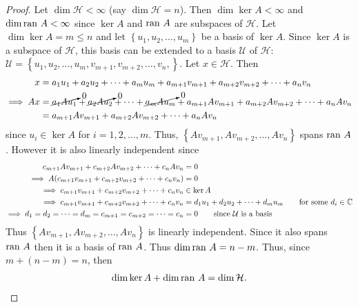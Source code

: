 \documentclass{article} %
\theoremstyle{plain}
\def\Cx{\mathbb{C}}
\newcommand{\ran}{\text{\rm ran }}
\numberwithin{equation}{section} %
\numberwithin{figure}{section} %
\numberwithin{table}{section} %
\begin{document}
\begin{proof}
    Let $\dim \mathcal{H} < \infty$ (say $\dim \mathcal{H} = n$).  Then $\dim \ker A < \infty$ and $\dim \ran A < \infty$ since $\ker A$ and $\ran A$ are subspaces of $\mathcal{H}$.  Let $\dim \ker A = m \leq n$ and let $\left\{u_1, u_2, \dots, u_m\right\}$ be a basis of $\ker A$.  Since $\ker A$ is a subspace of $\mathcal{H}$, this basis can be extended to a basis $\mathcal{U}$ of $\mathcal{H}$: $\mathcal{U} = \left\{u_1, u_2, \dots, u_m, v_{m+1}, v_{m+2}, \dots, v_{n}, \right\}$.  Let $x \in \mathcal{H}$.  Then
    \begin{align*}
        x &= a_1u_1 + a_2u_2 + \dots + a_mu_m + a_{m+1}v_{m+1} + a_{m+2}v_{m+2} + \dots + a_nv_n \\
        \implies Ax &= \cancelto{0}{a_1Au_1} + \cancelto{0}{a_2Au_2} + \dots + \cancelto{0}{a_mAu_m} + a_{m+1}Av_{m+1} + a_{m+2}Av_{m+2} + \dots + a_nAv_n \\
        &= a_{m+1}Av_{m+1} + a_{m+2}Av_{m+2} + \dots + a_nAv_n
    \end{align*}
    since $u_i \in \ker A$ for $i = 1, 2, \dots, m$.  Thus, $\left\{Av_{m+1}, Av_{m+2}, \dots, Av_n\right\}$ spans $\ran A$.  However it is also linearly independent since
    \begin{align*}
        c_{m+1}Av_{m+1} + c_{m+2}Av_{m+2} + \dots + c_nAv_n &= 0 \\
        \implies A\qty(c_{m+1}v_{m+1} + c_{m+2}v_{m+2} + \dots + c_nv_n) &= 0 \\
        \implies c_{m+1}v_{m+1} + c_{m+2}v_{m+2} + \dots + c_nv_n &\in \ker A \\
        \implies c_{m+1}v_{m+1} + c_{m+2}v_{m+2} + \dots + c_nv_n &= d_1u_1 + d_2u_2 + \dots + d_mu_m \qquad \text{for some $d_i \in \Cx$} \\
        \implies d_1 = d_2 = \dots = d_m = c_{m+1} = c_{m+2} = \dots = c_n &= 0 \qquad \text{since $\mathcal{U}$ is a basis}
    \end{align*}
    Thus $\left\{Av_{m+1}, Av_{m+2}, \dots, Av_n\right\}$ is linearly independent.  Since it also spans $\ran A$ then it is a basis of $\ran A$.  Thus $\dim \ran A = n - m$.  Thus, since $m + (n - m) = n$, then
    \begin{align*}
        \dim \ker A + \dim \ran A = \dim \mathcal{H}.
    \end{align*}


\end{proof}
\end{document}
